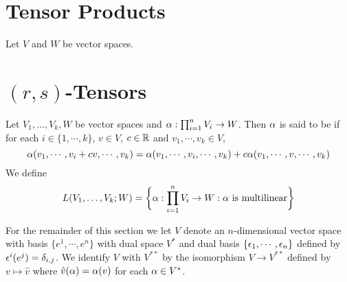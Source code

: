 \documentclass{book}
\begin{document}
	\section{Tensor Products}
	
	Let $V$ and $W$ be vector spaces. 
	
	
	
	
	
	
	
	
	
	
	
	
	
	
	
	
	
	
	
	
	
	
	
	
	
	
	
	
	
	
	
	
	
	
	
	
	
	
	
	
	
	
	
	
	
	
	
	
	
	
	
	
	
	
	\section{$(r,s)$-Tensors}
	
	\begin{defn}
	Let $V_1, \dots, V_k, W$ be vector spaces and $\alpha : \prod_{i=1}^n V_i \rightarrow W$. Then $\alpha$ is said to be  if for each $i \in \{1, \cdots, k\}$, $v \in V$, $c \in \mathbb{R}$ and $v_1, \cdots, v_k \in V$, $$\alpha(v_1, \cdots, v_i + cv, \cdots, v_k) = \alpha(v_1, \cdots, v_i, \cdots, v_k) + c\alpha(v_1, \cdots, v, \cdots, v_k)$$
	We define $$L(V_1, \dots, V_k; W) = \bigg \{\alpha : \prod_{i=1}^n V_i \rightarrow W: \alpha \text{ is multilinear} \bigg\}$$ 
	\end{defn}	
	
	\begin{note}
		For the remainder of this section we let $V$ denote an $n$-dimensional vector space with basis $\{e^1, \cdots, e^n\}$ with dual space $V^*$ and dual basis $\{\epsilon_1, \cdots, \epsilon_n\}$ defined by $\epsilon^i(e^j) = \delta_{i,j}$. We identify $V$ with $V^{**}$ by the isomorphism $V \rightarrow V^{**}$ defined by $v \mapsto \hat{v}$ where $\hat{v}(\alpha) = \alpha(v)$ for each $\alpha \in V^*$. 
	\end{note}	
	
\end{document}
